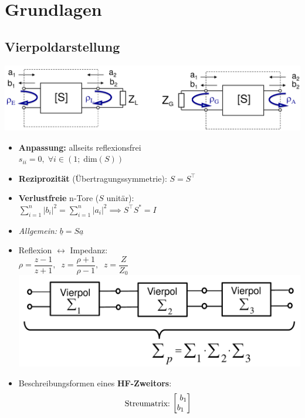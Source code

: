 \section{Grundlagen}
\subsection{Vierpoldarstellung}
\includegraphics[width=0.35\paperheight]{content/hfmess/pictures/hf_zweitor_reflektion.png}
\begin{itemize}
    \itemsep0pt
    \item \textbf{Anpassung:} allseits reflexionsfrei\\
        \(s_{ii} = 0, \;\forall i \in (1;\; \mathrm{dim}(S))\)
    \item \textbf{Reziprozität} (Übertragungssymmetrie): \(S = S^\top\)
    \item \textbf{Verlustfreie} n-Tore ($S$ unitär):\\
        \(\sum^n_{i=1} |b_i|^2 = \sum^n_{i=1} |a_i|^2 \implies S^\top S^* = I\)
    \item \textit{Allgemein:} \(\underline{b} = S \underline{a}\)
    \item Reflexion $\leftrightarrow$ Impedanz:\\
    \(\rho = \dfrac{z-1}{z+1},\;\; z = \dfrac{\rho+1}{\rho-1},\;\; z=\dfrac{Z}{Z_0}\)
   \includegraphics[width=0.35\paperheight]{content/hfmess/pictures/transmissionsmatrix.png}
    \item Beschreibungsformen eines \textbf{HF-Zweitors}:
    \begin{align*}
        \parbox{2cm}{Streumatrix:}
        \begin{bmatrix}\
            b_1\\
            b_1\
        \end{bmatrix}\

\end{align*}
\end{itemize}
